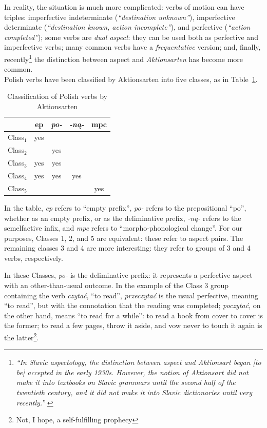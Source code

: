 \documentclass[11pt]{article}
\begin{document}
In reality, the situation is much more complicated: verbs of motion can
have triples: imperfective indeterminate ({\it ``destination unknown''}), 
imperfective determinate ({\it ``destination known, action incomplete''}),
and perfective ({\it ``action completed''}); some verbs are {\it dual aspect}:
they can be used both as perfective and imperfective verbs; many common
verbs have a {\it frequentative} version; and, finally, recently\footnote{
{\it ``In Slavic aspectology, the distinction between aspect and Aktionsart
began [to be] accepted in the early 1930s. However, the notion of Aktionsart did not make
it into textbooks on Slavic grammars until the second half of the twentieth century,
and it did not make it into Slavic dictionaries until very recently.''}
\cite[Ch.~2]{mlyn}}
the distinction between aspect and {\it Aktionsarten} has become more common.\\

Polish verbs have been classified by Aktionsarten\cite[Ch.~4]{mlyn} into
five classes, as in Table~\ref{table:aktionsarten}. 

\begin{table}[htdp]
\caption{Classification of Polish verbs by Aktionsarten}
\label{table:aktionsarten}
\begin{center}
\begin{tabular}{|l|c|c|c|c|}
\hline
& ep & {\it po-} & {\it -n\k{a}-} & mpc\\
\hline
\hline
Class$_{1}$ & yes & & & \\
\hline
Class$_{2}$ &  & yes & & \\
\hline
Class$_{3}$ & yes & yes & & \\
\hline
Class$_{4}$ & yes & yes & yes & \\
\hline
Class$_{5}$ & & & & yes \\
\hline
\end{tabular}
\end{center}
\end{table}

In the table, {\it ep} refers to ``empty prefix'', {\it po-} refers
to the prepositional ``po'', whether as an empty prefix, or as the
deliminative prefix, {\it -n\k{a}-} refers to the semelfactive infix,
and {\it mpc} refers to ``morpho-phonological change''. For our
purposes, Classes 1, 2, and 5 are equivalent: these refer to aspect
pairs. The remaining classes 3 and 4 are more interesting: they 
refer to groups of 3 and 4 verbs, respectively.

In these Classes, {\it po-} is the deliminative prefix: it represents
a perfective aspect with an other-than-usual outcome. In the example
of the Class 3 group containing the verb {\it czyta\'{c}}, ``to read'',
{\it przeczyta\'{c}} is the usual perfective, meaning ``to read'', but
with the connotation that the reading was completed; {\it poczyta\'{c}},
on the other hand, means ``to read for a while'': to read a book from
cover to cover is the former; to read a few pages, throw it aside, and 
vow never to touch it again is the latter\footnote{Not, I hope, a 
self-fulfilling prophecy}.
\end{document}
